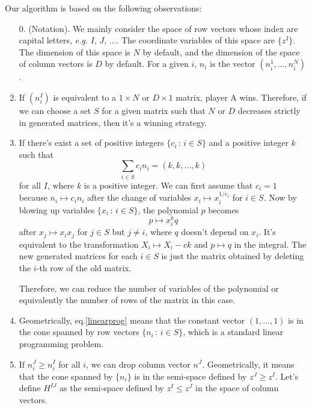 \documentclass[12pt]{article}
\theoremstyle{definition}
\theoremstyle{plain}
\begin{document}
Our algorithm is based on the following observations:
\begin{enumerate}
	\item[0.](Notation). We mainly consider the space of row vectors whose index are 
	capital letters, \textit{e.g.} $I$, $J$, .... 
	The coordinate variables of this space are $\{z^I\}$.
	The dimension of this space is $N$ by default, and the dimension of the space
	of column vectors is $D$ by default. For a given $i$, $n_i$ is the vector
	$(n_i^1,\dots,n_i^N)$.
	
	\item If $(n^I_i)$ is equivalent to a $1\times N$ or $D\times 1$ matrix, player A wins. 
	Therefore, if we can choose a set $S$ for a given matrix such that $N$ or $D$ 
	decreases strictly in generated matrices, then it's a winning strategy.

	\item If there's exist a set of positive integers $\{c_i\,:\,i\in S\}$ and a 
	positive integer $k$ such that
	\begin{equation}\label{linearprog}
		\sum_{i\in S} c_i n_i = (k,k,\dots,k)
	\end{equation}	
	for all $I$, where $k$ is a positive integer. 
	We can first assume that $c_i=1$ because $n_i\mapsto c_i n_i$ after the 
	change of variables $x_i\mapsto x_i^{1/c_i}$ for $i\in S$.
	Now by blowing up variables $\{x_i\,:\, i\in S\}$, the polynomial $p$ becomes
	\[
		p\mapsto x_i^k q
	\]
	after $x_j\mapsto x_ix_j$ for $j\in S$ but $j\neq i$, where $q$ doesn't depend on $x_i$.
	It's equivalent to the transformation $X_i\mapsto X_i-ck$ and $p\mapsto q$ 
	in the integral. The new generated matrices for each $i\in S$ is just the matrix
	obtained by deleting the $i$-th row of the old matrix.
	
	Therefore, we can reduce the number of variables of the polynomial or equivalently 
	the number of rows of the matrix in this case.

	\item Geometrically, eq.\eqref{linearprog} means that the constant vector $(1,\dots,1)$ 
	is in the cone spanned by row vectors $\{n_i\,:\,i\in S\}$, which is a standard linear 
	programming problem. 

	\item If $n^J_i \geq n^I_i$ for all $i$, we can drop column vector $n^J$. Geometrically, 
	it means that the cone spanned by $\{n_i\}$ is in the semi-space defined by $z^J\geq z^I$.
	Let's define $H^{IJ}$ as the semi-space defined by $z^I\leq z^J$ in the space of 
	column vectors.
	

\end{enumerate}
\end{document}
